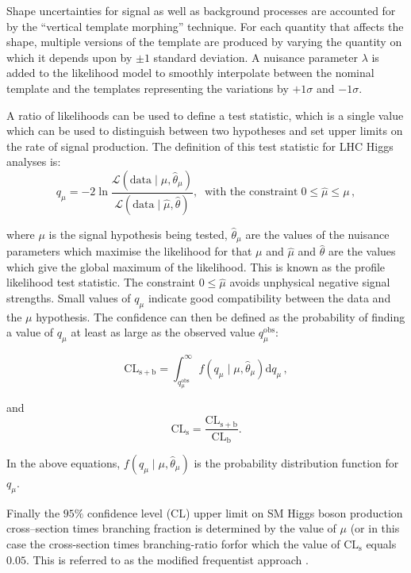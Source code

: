 Shape uncertainties for signal as well as background processes are accounted 
for by the ``vertical template morphing'' technique. For each quantity that affects the shape,
multiple versions of the template are produced by varying the quantity on which it 
depends upon by $\pm 1$ standard deviation. A nuisance parameter $\lambda$ is added to the likelihood model 
to smoothly interpolate between the nominal template
and the templates representing the variations by $+1 \sigma$ and $-1 \sigma$.

A ratio of likelihoods can be used to define a test statistic, which is a
single value which can be used to distinguish between two hypotheses and set
upper limits on the rate of signal production. The definition of this test
statistic for \ac{LHC} Higgs analyses is: 
\begin{equation}
q_{\mu} = -2
\ln\frac{\mathcal{L}(\mathrm{data}\mid\mu,\hat{\theta}_{\mu})}{\mathcal{L}(\mathrm{data}\mid\hat{\mu},\hat{\theta})},
\;\; \text{with the constraint} \; 0\leq\hat{\mu}\leq\mu\, ,
\label{eq:ProfileLikelihood}
\end{equation}

where $\mu$ is the signal hypothesis being tested, $\hat{\theta}_{\mu}$ are the
values of the nuisance parameters which maximise the likelihood for that $\mu$
and $\hat{\mu}$ and $\hat{\theta}$ are the values which give the global maximum
of the likelihood. This is known as the profile likelihood test statistic. 
The constraint $0\leq\hat{\mu}$ avoids unphysical negative
signal strengths. Small values of $q_{\mu}$ indicate good compatibility between
the data and the $\mu$ hypothesis. The confidence can then be defined as the
probability of finding a value of $q_{\mu}$ at least as large as the observed
value $q_{\mu}^{\mathrm{obs}}$: 

\begin{equation} \label{eqn:cl_splusb}
\mathrm{CL_{s+b}} =
\int_{q_{\mu}^{\mathrm{obs}}}^{\infty}f(q_{\mu}\mid\mu,\hat{\theta}_{\mu})\mathrm{d}q_{\mu}\,
,
\end{equation}

and 
\begin{equation}
\mathrm{CL_{s}} = \frac{\mathrm{CL_{s+b}}}{\mathrm{CL_{b}}}.
\end{equation}

In the above equations, $f(q_{\mu}\mid\mu,\hat{\theta}_{\mu})$ is the
probability distribution function for $q_{\mu}$. 

Finally the $95\%$ confidence level (CL) upper limit on \ac{SM} Higgs boson production
cross--section times branching fraction is determined by the value of $\mu$ (or
in this case the cross-section times branching-ratio forfor which the value of 
$\mathrm{CL_{s}}$ equals $0.05$. This is referred to as the modified frequentist approach
\cite{Read2}.


